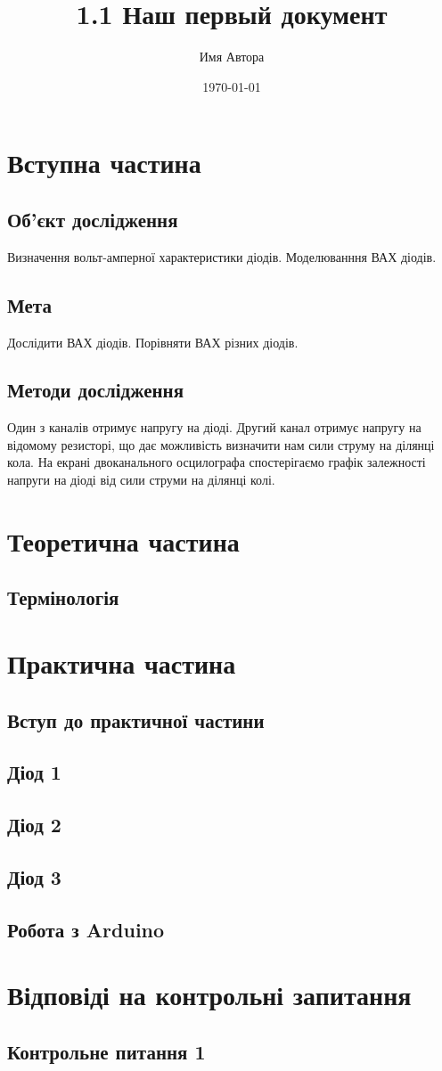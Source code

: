 \documentclass[a4paper,12pt]{article}
\author{Имя Автора}
\title{1.1 Наш первый документ}
\date{\today}
\begin{document}




\tableofcontents

\newpage

\section{Вступна частина}
\subsection{Об'єкт дослідження}
Визначення вольт-амперної характеристики діодів. Моделюванння ВАХ діодів.
\subsection{Мета}
Дослідити ВАХ діодів. Порівняти ВАХ різних діодів.
\subsection{Методи дослідження}
Один з каналів отримує напругу на діоді. Другий канал отримує напругу на відомому резисторі, що дає можливість визначити нам сили струму на ділянці кола. На екрані двоканального осцилографа спостерігаємо графік залежності напруги на діоді від сили струми на ділянці колі.

\section{Теоретична частина}
\subsection{Термінологія}

\newpage


\section{Практична частина}
\subsection{Вступ до практичної частини}

\newpage
\subsection{Діод 1}

\newpage
\subsection{Діод 2}

\newpage
\subsection{Діод 3}

\newpage
\subsection{Робота з Arduino}







\section{Відповіді на контрольні запитання}
\subsection{Контрольне питання 1}
\end{document}
